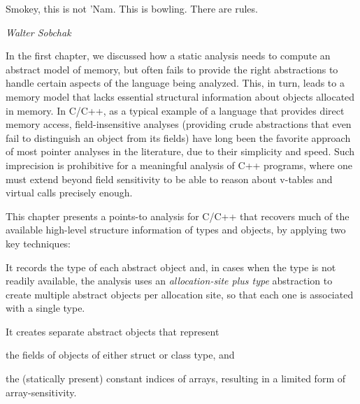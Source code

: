 \label{chapter:structsens}
\epigraph{Smokey, this is not 'Nam. This is bowling. There are
  rules.}{\textit{Walter Sobchak}}

In the first chapter, we discussed how a static analysis needs to
compute an abstract model of memory, but often fails to provide
the right abstractions to handle certain aspects of the language being
analyzed. This, in turn, leads to a memory model that lacks essential
structural information about objects allocated in memory. In C/C++, as
a typical example of a language that provides direct memory access,
field-insensitive analyses (providing crude abstractions that even fail
to distinguish an object from its fields) have long been the favorite
approach of most pointer analyses in the literature, due to their
simplicity and speed.
%
Such imprecision is prohibitive for a meaningful analysis of C++
programs, where one must extend beyond field sensitivity to be able
to reason about v-tables and virtual calls precisely enough.

This chapter presents a points-to analysis for C/C++ that recovers
much of the available high-level structure information of types and
objects, by applying two key techniques:
\begin{inparaenum}[(1)]
\item It records the type of each abstract object and, in cases
  when the type is not readily available, the analysis uses an
  \emph{allocation-site plus type} abstraction to create multiple
  abstract objects per allocation site, so that each one is
  associated with a single type.
\item It creates separate abstract objects that represent
  \begin{inparaenum}[(a)]
  \item the fields of objects of either struct or class type, and
  \item the (statically present) constant indices of arrays,
    resulting in a limited form of array-sensitivity.
  \end{inparaenum}
\end{inparaenum}





